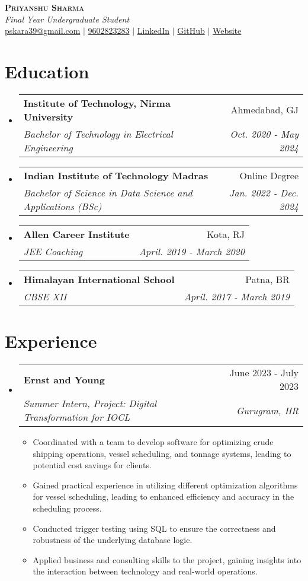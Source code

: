 \documentclass[letterpaper,11pt]{article}
\makeatletter
\newcommand{\resumeItem}[1]{
  \item\small{
    {#1 \vspace{-2pt}}
  }
}
\newcommand{\resumeSubheading}[4]{
  \vspace{-2pt}\item
    \begin{tabular*}{0.97\textwidth}[t]{l@{\extracolsep{\fill}}r}
      \textbf{#1} & #2 \\
      \textit{\small#3} & \textit{\small #4} \\
    \end{tabular*}\vspace{-7pt}
}
\newcommand{\resumeSubHeadingListStart}{\begin{itemize}[leftmargin=0.15in, label={}]}
\newcommand{\resumeSubHeadingListEnd}{\end{itemize}}
\newcommand{\resumeItemListStart}{\begin{itemize}}
\newcommand{\resumeItemListEnd}{\end{itemize}\vspace{-5pt}}
\makeatother
\begin{document}
\begin{center}
    \textbf{\Huge \scshape Priyanshu Sharma} \\ \vspace{1pt}
    \textit{Final Year Undergraduate Student} \\
    \href{mailto:pskara39@gmail.com}{{pskara39@gmail.com}} $|$ \href{tel:9602823283}{{9602823283}} $|$
    \href{https://www.linkedin.com/in/priyanshusharma24}{{LinkedIn}}
    $|$ \href{https://github.com/codekashyap}{GitHub} $|$
    \href{https://sites.google.com/ds.study.iitm.ac.in/priyanshu-sharma/home?authuser=0}{Website}
\end{center}


\section{Education}
\resumeSubHeadingListStart
\resumeSubheading
{Institute of Technology, Nirma University}{Ahmedabad, GJ}
{Bachelor of Technology in Electrical Engineering}{Oct. 2020 - May 2024}
\resumeSubheading
{Indian Institute of Technology Madras}{Online Degree}
{Bachelor of Science in Data Science and Applications (BSc)}{Jan. 2022 - Dec. 2024}
\resumeSubheading
{Allen Career Institute}{Kota, RJ}
{JEE Coaching}{April. 2019 - March 2020}
\resumeSubheading
{Himalayan International School}{Patna, BR}
{CBSE XII}{April. 2017 - March 2019}
\resumeSubHeadingListEnd

\section{Experience}
\resumeSubHeadingListStart
\resumeSubheading
{Ernst and Young}{June 2023 - July 2023}
{Summer Intern, Project: Digital Transformation for IOCL}{Gurugram, HR}
\resumeItemListStart
\resumeItem{Coordinated with a team to develop software for optimizing crude shipping operations, vessel scheduling, and tonnage systems, leading to potential cost savings for clients.}
\resumeItem{Gained practical experience in utilizing different optimization algorithms for vessel scheduling, leading to enhanced efficiency and accuracy in the scheduling process.}
\resumeItem{Conducted trigger testing using SQL to ensure the correctness and robustness of the underlying database logic.}
\resumeItem{Applied business and consulting skills to the project, gaining insights into the interaction between technology and real-world operations.}
\resumeItemListEnd
\resumeSubHeadingListEnd
\end{document}
